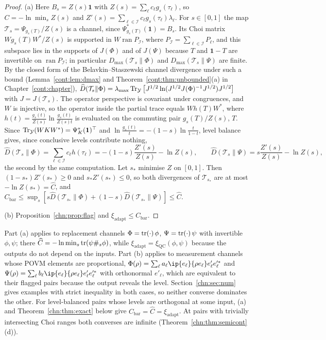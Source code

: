 \begin{proof}
(a) Here $B_s=Z(s)\mathbf 1$ with $Z(s)=\sum_\ell c_\ell g_s(\tau_\ell)$, so $\widehat C=-\ln\min_sZ(s)$ and $Z'(s)=\sum_{\ell\in\mathcal I}c_\ell g_s(\tau_\ell)\lambda_\ell$. For $s\in[0,1]$ the map $\mathcal T_s=\Psi_{g_s(T)}/Z(s)$ is a channel, since $\Psi_{g_s(T)}^*(\mathbf 1)=B_s$. Its Choi matrix $Wg_s(T)W^*/Z(s)$ is supported in $W\operatorname{ran}P_{\mathcal I}$, where $P_{\mathcal I}=\sum_{\ell\in\mathcal I}P_\ell$, and this subspace lies in the supports of $J(\Phi)$ and of $J(\Psi)$ because $T$ and $\mathbf 1-T$ are invertible on $\operatorname{ran}P_{\mathcal I}$; in particular $D_{\max}(\mathcal T_s\|\Phi)$ and $D_{\max}(\mathcal T_s\|\Psi)$ are finite. By the closed form of the Belavkin--Staszewski channel divergence under such a bound \cite{FangFawzi2021,JMMW2024} (Lemma~\ref{cont:lem:dmax} and Theorem~\ref{cont:thm:unbounded}(a) in Chapter~\ref{cont:chapter}), $\widehat D(\mathcal T_s\|\Phi)=\lambda_{\max}\operatorname{Tr}_{\mathcal Y}\big[J^{1/2}\ln(J^{1/2}J(\Phi)^{-1}J^{1/2})J^{1/2}\big]$ with $J=J(\mathcal T_s)$. The operator perspective is covariant under congruences, and $W$ is injective, so the operator inside the partial trace equals $Wh(T)W^*$, where $h(t)=\frac{g_s(t)}{Z(s)}\ln\frac{g_s(t)}{Z(s)t}$ is evaluated on the commuting pair $g_s(T)/Z(s)$, $T$. Since $\operatorname{Tr}_{\mathcal Y}(WKW^*)=\Psi_K^*(\mathbf 1)^\top$ and $\ln\frac{g_s(t)}{t}=-(1-s)\ln\frac t{1-t}$, level balance gives, since conclusive levels contribute nothing,
\[
\widehat D(\mathcal T_s\|\Phi)=\sum_{\ell\in\mathcal I}c_\ell h(\tau_\ell)=-(1-s)\frac{Z'(s)}{Z(s)}-\ln Z(s),\qquad\widehat D(\mathcal T_s\|\Psi)=s\frac{Z'(s)}{Z(s)}-\ln Z(s),
\]
the second by the same computation. Let $s_*$ minimise $Z$ on $[0,1]$. Then $(1-s_*)Z'(s_*)\ge0$ and $s_*Z'(s_*)\le0$, so both divergences of $\mathcal T_{s_*}$ are at most $-\ln Z(s_*)=\widehat C$, and $C_{\mathrm{bar}}\le\sup_s[s\widehat D(\mathcal T_{s_*}\|\Phi)+(1-s)\widehat D(\mathcal T_{s_*}\|\Psi)]\le\widehat C$.

(b) Proposition~\ref{chn:prop:flag} and $\xi_{\mathrm{adapt}}\le C_{\mathrm{bar}}$.
\end{proof}

Part (a) applies to replacement channels $\Phi=\operatorname{tr}(\cdot)\,\phi$, $\Psi=\operatorname{tr}(\cdot)\,\psi$ with invertible $\phi,\psi$; there $\widehat C=-\ln\min_s\operatorname{tr}(\psi\#_s\phi)$, while $\xi_{\mathrm{adapt}}=\xi_{\mathrm{QC}}(\phi,\psi)$ because the outputs do not depend on the inputs. Part (b) applies to measurement channels whose POVM elements are proportional, $\Phi(\rho)=\sum_\ell a_\ell\ip{e_\ell}{\rho e_\ell}e_\ell'e_\ell'^*$ and $\Psi(\rho)=\sum_\ell b_\ell\ip{e_\ell}{\rho e_\ell}e_\ell'e_\ell'^*$ with orthonormal $e'_\ell$, which are equivalent to their flagged pairs because the output reveals the level. Section~\ref{chn:sec:num} gives examples with strict inequality in both cases, so neither converse dominates the other. For level-balanced pairs whose levels are orthogonal at some input, (a) and Theorem~\ref{chn:thm:exact} below give $C_{\mathrm{bar}}=\widehat C=\xi_{\mathrm{adapt}}$. At pairs with trivially intersecting Choi ranges both converses are infinite (Theorem~\ref{chn:thm:semicont}(d)).

